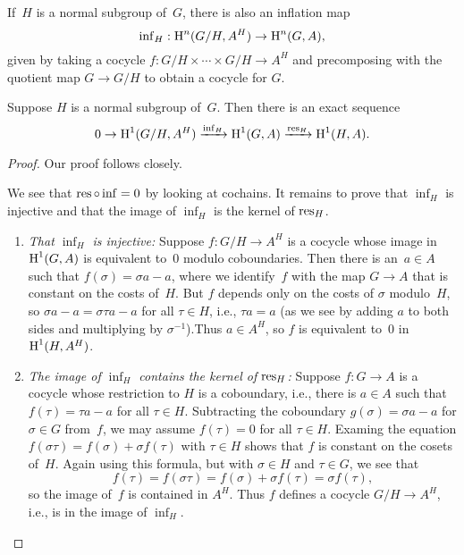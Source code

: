 If~$H$ is a normal subgroup of~$G$, there is also an inflation map
$$
\operatorname{inf}_H: \operatorname{H}^n(G/H, A^H) \to \operatorname{H}^n(G,A),
$$
given by taking a cocycle $f : G/H \times \cdots \times G/H \to A^H$
and precomposing with the quotient map $G\to G/H$ to obtain a cocycle for $G$.

\begin{proposition}\label{prop:infres}
Suppose $H$ is a normal subgroup of~$G$.
Then there is an exact sequence
$$
  0 \to \operatorname{H}^1(G/H, A^H)\xrightarrow{\operatorname{inf}_H}  \operatorname{H}^1(G,A)\xrightarrow{\operatorname{res}_H} \operatorname{H}^1(H,A).
$$
\end{proposition}
\begin{proof}
Our proof follows \cite[pg.~117]{serre:localfields} closely.

We see that $\operatorname{res}\circ \operatorname{inf} = 0$ by looking at cochains.  It remains
to prove that $\inf_H$ is injective and that the image of $\inf_H$
is the kernel of $\operatorname{res}_H$.
\begin{enumerate}

\item {\em That $\inf_H$ is injective:} Suppose $f:G/H\to A^H$ is a
  cocycle whose image in $\operatorname{H}^1(G,A)$ is equivalent to~$0$ modulo
  coboundaries.  Then there is an~$a\in A$ such that $f(\sigma) =
  \sigma a - a$, where we identify~$f$ with the map $G\to A$ that is
  constant on the costs of~$H$.  But $f$ depends only on the costs of
  $\sigma$ modulo~$H$, so $\sigma a - a = \sigma \tau a - a$ for all
  $\tau \in H$, i.e., $\tau a = a$ (as we see by adding $a$ to both
  sides and multiplying by $\sigma^{-1}$).Thus $a\in A^H$, so $f$ is
  equivalent to~$0$ in $\operatorname{H}^1(H,A^H)$.

\item {\em The image of $\inf_H$ contains the kernel of $\operatorname{res}_H$:}
Suppose $f:G\to A$ is a cocycle whose
restriction to $H$ is a coboundary, i.e., there is $a\in A$ such
that $f(\tau) = \tau a - a$ for all $\tau \in H$. 
Subtracting the coboundary $g(\sigma) = \sigma a - a$ for $\sigma\in G$ 
from~$f$, we may assume $f(\tau) = 0$ for all $\tau \in H$.
Examing the equation $f(\sigma\tau) = f(\sigma) + \sigma f(\tau)$ 
with $\tau\in H$ shows that $f$ is constant on the cosets of~$H$.
Again using this formula, but with $\sigma\in H$ and $\tau\in G$, we see
that 
$$
  f(\tau) = f(\sigma \tau) = f(\sigma) + \sigma f(\tau) = \sigma f(\tau),
$$
so the image of~$f$ is contained in $A^H$.  Thus $f$ defines a cocycle
$G/H \to A^H$, i.e., is in the image of $\inf_H$.
\end{enumerate}

\end{proof}

